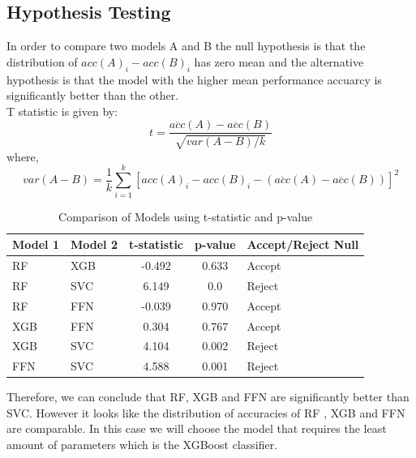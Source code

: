 \begin{appendices}

    \pagebreak
    \section{Hypothesis Testing}
    In order to compare two models A and B the null hypothesis is that the distribution of $acc(A)_i - acc(B)_i$ has zero mean and the alternative hypothesis is that the model with the higher mean performance accuarcy is significantly better than the other.\\
    T statistic is given by:
        \[
        t = \frac{\overline{acc}(A) - \overline{acc}(B)}{\sqrt{var(A - B)/k}}
        \]
        where,
        \[
        var(A - B) = \frac{1}{k}\sum_{i=1}^k [acc(A)_i - acc(B)_i - (\overline{acc}(A) - \overline{acc}(B))]^2
        \]

        \begin{table}[h!]
            \centering
            \caption{Comparison of Models using t-statistic and p-value}
            \begin{tabular}{|l|l|c|c|l|}
                \hline
                \textbf{Model 1} & \textbf{Model 2} & \textbf{t-statistic} & \textbf{p-value} & \textbf{Accept/Reject Null} \\
                \hline
                RF & XGB & -0.492 & 0.633 & Accept \\
                \hline
                RF & SVC & 6.149 & 0.0 & Reject \\
                \hline
                RF & FFN & -0.039 & 0.970 & Accept \\
                \hline
                XGB & FFN & 0.304 & 0.767 & Accept \\
                \hline
                XGB & SVC & 4.104 & 0.002 & Reject \\
                \hline
                FFN & SVC & 4.588 & 0.001 & Reject \\
                \hline
            \end{tabular}
        \end{table}
    Therefore, we can conclude that RF, XGB and FFN are significantly better than SVC. 
    However it looks like the distribution of accuracies of RF , XGB and FFN are comparable. 
    In this case we will choose the model that requires the least amount of parameters which is the XGBoost classifier.


\end{appendices}
